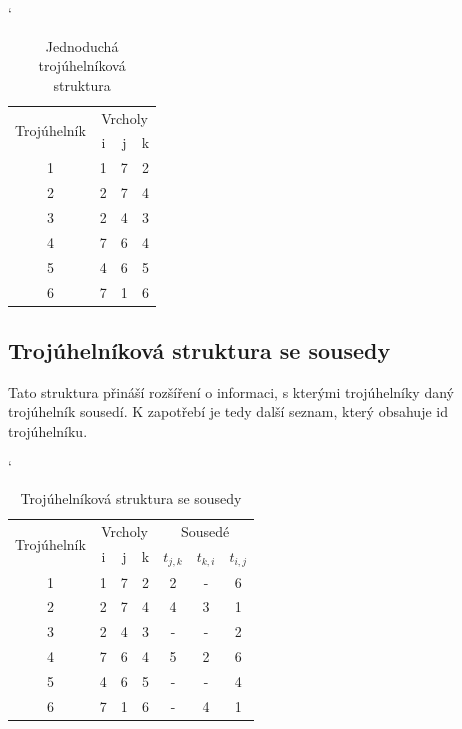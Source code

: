 \documentclass[12pt,a4paper]{article}
\begin{document}
\begin{table}[h]
\catcode`
\begin{tabular}{|c||c|c|c|}
\hline
\multirow{2}{*}{Trojúhelník} & \multicolumn{3}{c|}{Vrcholy} \\ \cline{2-4} 
                             & i        & j       & k       \\ \hline \hline
1                            & 1        & 7       & 2       \\ \hline
2                            & 2        & 7       & 4       \\ \hline
3                            & 2        & 4       & 3       \\ \hline
4                            & 7        & 6       & 4       \\ \hline
5                            & 4        & 6       & 5       \\ \hline
6                            & 7        & 1       & 6       \\ \hline
\end{tabular}
\caption{Jednoduchá trojúhelníková struktura}
\label{tab:troj_struktura_simple}
\end{table}



\subsection{Trojúhelníková struktura se sousedy}

Tato struktura přináší rozšíření o informaci, s kterými trojúhelníky
daný trojúhelník sousedí. K zapotřebí je tedy další seznam, který
obsahuje id trojúhelníku.

\begin{table}[h]
\catcode`
\begin{tabular}{|c||c|c|c||c|c|c|}
\hline
\multirow{2}{*}{Trojúhelník} & \multicolumn{3}{|c|}{Vrcholy} & \multicolumn{3}{|c|}{Sousedé}      \\ \cline{2-7} 
                             & i        & j       & k       & $t_{j,k}$ & $t_{k,i}$ & $t_{i,j}$ \\ \hline \hline
1                            & 1        & 7       & 2       & 2         & -         & 6         \\ \hline
2                            & 2        & 7       & 4       & 4         & 3         & 1         \\ \hline
3                            & 2        & 4       & 3       & -         & -         & 2         \\ \hline
4                            & 7        & 6       & 4       & 5         & 2         & 6         \\ \hline
5                            & 4        & 6       & 5       & -         & -         & 4         \\ \hline
6                            & 7        & 1       & 6       & -         & 4         & 1         \\ \hline
\end{tabular}
\caption{Trojúhelníková struktura se sousedy}
\label{tab:troj_strukt_sous}
\end{table}
\end{document}
